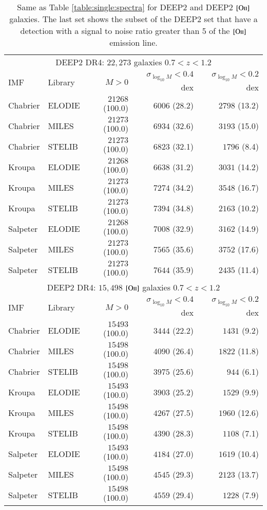 \documentclass[onecolumn]{aa}
\newcommand{\OII}{$\left[\mathrm{O\textrm{\textsc{ii}}}\right]$\xspace}
\begin{document}
\begin{table*}
\caption{\label{table:single:spectra:deep2} Same as Table \ref{table:single:spectra} for DEEP2 and DEEP2 \OII galaxies.
The last set shows the subset of the DEEP2 set that have a detection with a signal to noise ratio greater than 5 of the \OII emission line. }
\begin{center}
\begin{tabular}{ll rrr}
\hline \hline
\multicolumn{5}{c}{DEEP2 DR4: $22,273$ galaxies $0.7<z<1.2$} \\                
IMF &                                                                          
Library & 
$M>0$ & 
$\sigma_{\log_{10}M}<0.4$ dex & 
$\sigma_{\log_{10}M}<0.2$ dex \\ \hline
Chabrier & ELODIE& $21268$ (100.0) & $6006$ (28.2) & $2798$ (13.2) \\
Chabrier & MILES& $21273$ (100.0) & $6934$ (32.6) & $3193$ (15.0) \\ 
Chabrier & STELIB& $21273$ (100.0) & $6823$ (32.1) & $1796$ (8.4) \\ 
Kroupa & ELODIE& $21268$ (100.0) & $6638$ (31.2) & $3031$ (14.2) \\ 
Kroupa & MILES& $21273$ (100.0) & $7274$ (34.2) & $3548$ (16.7) \\ 
Kroupa & STELIB& $21273$ (100.0) & $7394$ (34.8) & $2163$ (10.2) \\ 
Salpeter & ELODIE& $21268$ (100.0) & $7008$ (32.9) & $3162$ (14.9) \\ 
Salpeter & MILES& $21273$ (100.0) & $7565$ (35.6) & $3752$ (17.6) \\ 
Salpeter & STELIB& $21273$ (100.0) & $7644$ (35.9) & $2435$ (11.4) \\ 
\hline 
\multicolumn{5}{c}{DEEP2 DR4: $15,498$ \OII galaxies $0.7<z<1.2$} \\
IMF &
Library & 
$M>0$ & 
$\sigma_{\log_{10}M}<0.4$ dex & 
$\sigma_{\log_{10}M}<0.2$ dex \\ \hline
Chabrier & ELODIE & $15493$ (100.0) & $3444$ (22.2) & $1431$ (9.2) \\ 
Chabrier & MILES & $15498$ (100.0) & $4090$ (26.4) & $1822$ (11.8) \\ 
Chabrier & STELIB & $15498$ (100.0) & $3975$ (25.6) & $944$ (6.1) \\ 
Kroupa & ELODIE & $15493$ (100.0) & $3903$ (25.2) & $1529$ (9.9) \\ 
Kroupa & MILES & $15498$ (100.0) & $4267$ (27.5) & $1960$ (12.6) \\ 
Kroupa & STELIB & $15498$ (100.0) & $4390$ (28.3) & $1108$ (7.1) \\ 
Salpeter & ELODIE & $15493$ (100.0) & $4184$ (27.0) & $1619$ (10.4) \\ 
Salpeter & MILES & $15498$ (100.0) & $4545$ (29.3) & $2123$ (13.7) \\ 
Salpeter & STELIB & $15498$ (100.0) & $4559$ (29.4) & $1228$ (7.9) \\ 
\hline
\end{tabular}
\end{center}
\end{table*}
\end{document}

